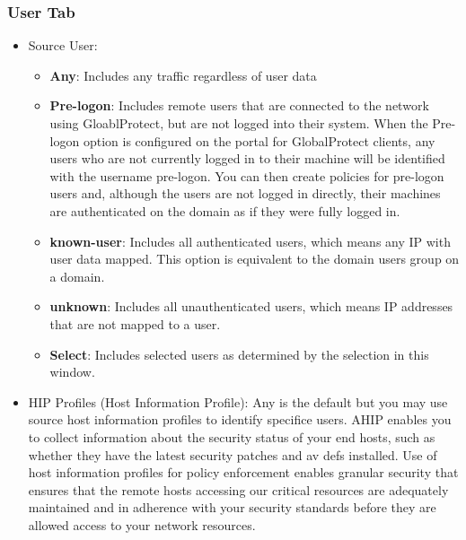 \subsubsection{User Tab}
    \begin{itemize}
        \item Source User:
            \begin{itemize}
                \item \textbf{Any}: Includes any traffic regardless of user data
                \item \textbf{Pre-logon}:  Includes remote users that are connected to the network using GloablProtect, but are not logged into their system. When the Pre-logon option is configured on the portal for GlobalProtect clients, any users who are not currently logged in to their machine will be identified with the username pre-logon. You can then create policies for pre-logon users and, although the users are not logged in directly, their machines are authenticated on the domain as if they were fully logged in.
                \item \textbf{known-user}:  Includes all authenticated users, which means any IP with user data mapped. This option is equivalent to the domain users group on a domain.
                \item \textbf{unknown}:  Includes all unauthenticated users, which means IP addresses that are not mapped to a user.
                \item \textbf{Select}:  Includes selected users as determined by the selection in this window.
            \end{itemize}
        \item HIP Profiles (Host Information Profile): Any is the default but you may use source host information profiles to identify specifice users. AHIP enables you to collect information about the security status of your end hosts, such as whether they have the latest security patches and av defs installed.  Use of host information profiles for policy enforcement enables granular security that ensures that the remote hosts accessing our critical resources are adequately maintained and in adherence with your security standards before they are allowed access to  your network resources.
    \end{itemize}
